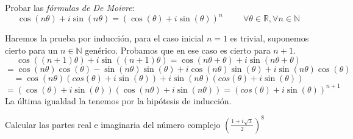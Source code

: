 \begin{ejer}
	Probar las \textit{fórmulas de De Moivre}:
	$$ \cos(n\theta) + i\sin(n\theta) = (\cos(\theta)+i\sin(\theta))^n \hspace{1cm}\forall\theta\in\mathbb{R}, \forall n\in\mathbb{N} $$
\end{ejer}


\begin{sol}
	Haremos la prueba por inducción, para el caso inicial $n=1$ es trivial, suponemos cierto para un $n\in\mathbb{N}$ genérico.
	Probamos que en ese caso es cierto para $n+1$.
	$$ 
	\cos((n+1)\theta)+i\sin((n+1)\theta) 
	=
	\cos(n\theta+\theta)+i\sin(n\theta+\theta)
	$$
	$$ =
	\cos(n\theta) \cos(\theta)- \sin(n\theta)\sin(\theta) +i\cos(n\theta)\sin(\theta) + i\sin(n\theta)\cos(\theta) $$
	$$ =
	\cos(n\theta)(cos(\theta)+i\sin(\theta)) + i\sin(n\theta)(cos(\theta)+i\sin(\theta))
	$$
	$$=
	(\cos(\theta)+i\sin(\theta)) (\cos(n\theta)+i\sin(n\theta))
	=
	(cos(\theta)+i\sin(\theta))^{n+1}
	$$
	La última igualdad la tenemos por la hipótesis de inducción.
\end{sol}



\begin{ejer}
	Calcular las partes real e imaginaria del número complejo 
	$\left( \frac{1+i\sqrt{3}}{2} \right)^8$
\end{ejer}


